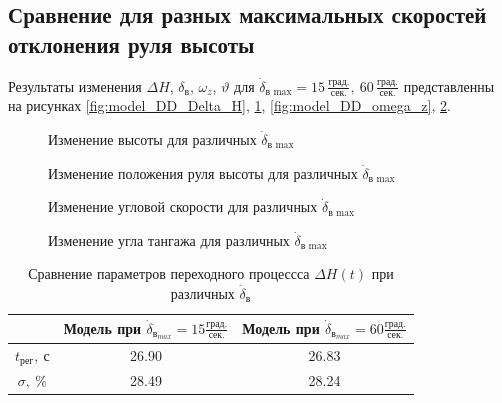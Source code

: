 \subsection{Сравнение для разных максимальных скоростей отклонения руля высоты}

Результаты изменения $\Delta H$, $\delta_{в}$, $\omega_z$, $\vartheta$ для
$\dot{\delta}_\text{в max} = 15\, \frac{\text{град.}}{\text{сек.}},\ 60\, \frac{\text{град.}}{\text{сек.}}$
представленны на рисунках \ref{fig:model_DD_Delta_H},
\ref{fig:model_DD_delta_elevator}, \ref{fig:model_DD_omega_z}, \ref{fig:model_DD_theta}.

\begin{figure}[H]
    \begin{minipage}{0.48\textwidth}
    \centering
    \resizebox{1.1\linewidth}{!}{}
    \caption{Изменение высоты для различных $\dot{\delta}_\text{в max}$}
    \label{fig:model_DD_Delta_H}
    \end{minipage}
    \hfill
    \begin{minipage}{0.48\textwidth}
    \centering
    \resizebox{1.1\linewidth}{!}{}
    \caption{Изменение положения руля высоты для различных $\dot{\delta}_\text{в max}$}
    \label{fig:model_DD_delta_elevator}
    \end{minipage}
\end{figure}
\begin{figure}[H]
    \begin{minipage}{0.48\textwidth}
    \centering
    \resizebox{1.1\linewidth}{!}{}
    \caption{Изменение угловой скорости для различных $\dot{\delta}_\text{в max}$}
    \label{fig:model_DD_omega_z}
    \end{minipage}
    \hfill
    \begin{minipage}{0.48\textwidth}
    \centering
    \resizebox{1.1\linewidth}{!}{}
    \caption{Изменение угла тангажа для различных $\dot{\delta}_\text{в max}$}
    \label{fig:model_DD_theta}
\end{minipage}
\end{figure}

\begin{table}[H]
    \centering
    \caption{Сравнение параметров переходного процессса $\Delta H(t)$ при различных $\dot{\delta}_{в}$}
    \label{tab:stat_DD}

    \begin{tabular}{|c|c|c|}
        \hline
        {} &  Модель при $\dot{\delta}_{{в}_{max}}=15 \frac{град.}{сек.}$ &  Модель при $\dot{\delta}_{{в}_{max}}=60 \frac{град.}{сек.}$ \\
        \hline
        $t_{рег},\ с$ &                                              26.90 &                                              26.83 \\
        \hline
        $\sigma,\ \%$ &                                              28.49 &                                              28.24 \\
        \hline
    \end{tabular}
\end{table}
